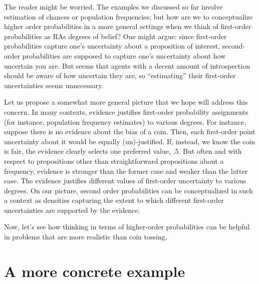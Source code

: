 \documentclass[
  10pt,
  dvipsnames,enabledeprecatedfontcommands]{scrartcl}
\begin{document}

The reader might be worried. The examples we discussed so far involve
estimation of chances or population frequencies; but how are we to
conceptualize higher order probabilities in a more general settings when
we think of first-order probabilities as RAs degrees of belief? One
might argue: since first-order probabilities capture one's uncertainty
about a proposition of interest, second-order probabilities are supposed
to capture one's uncertainty about how uncertain you are. But seems that
agents with a decent amount of introspection should be aware of how
uncertain they are, so ``estimating'' their first-order uncertainties
seems unnecessary.

Let us propose a somewhat more general picture that we hope will address
this concern. In many contexts, evidence justifies first-order
probability assignments (for instance, population frequency estimates)
to various degrees. For instance, suppose there is no evidence about the
bias of a coin. Then, each first-order point uncertainty about it would
be equally (un)-justified. If, instead, we know the coin is fair, the
evidence clearly selects one preferred value, .5. But often and with
respect to propositions other than straightforward propositions about a
frequency, evidence is stronger than the former case and weaker than the
latter case. The evidence justifies different values of first-order
uncertainty to various degrees. On our picture, second order
probabilities can be conceptualized in such a context as densities
capturing the extent to which different first-order uncertainties are
supported by the evidence.

Now, let's see how thinking in terms of higher-order probabilities can
be helpful in problems that are more realistic than coin tossing.

\hypertarget{a-more-concrete-example}{%
\section{A more concrete example}\label{a-more-concrete-example}}
\end{document}
